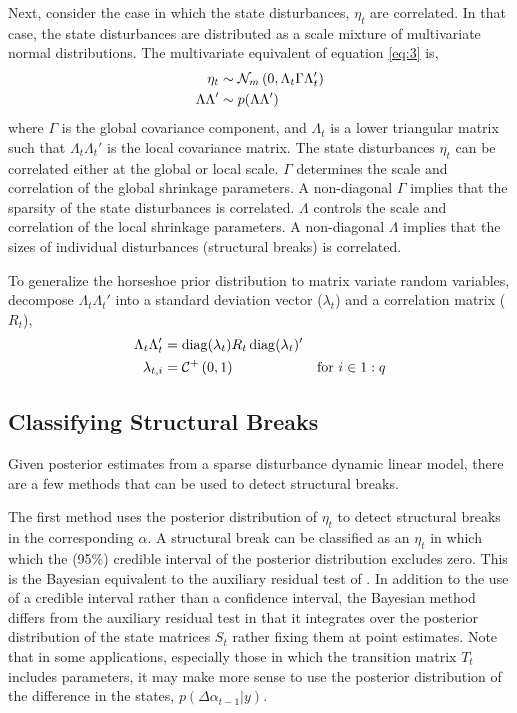 \documentclass{article}
\begin{document}
Next, consider the case in which the state disturbances, $\eta_{t}$ are correlated.
In that case, the state disturbances are distributed as a scale mixture of multivariate normal distributions.
The multivariate equivalent of equation \eqref{eq:3} is,
\begin{equation}
  \begin{aligned}[t]
    \eta_{t} &\sim \dmvnorm{0, \Lambda_{t} \Gamma \Lambda_{t}'}{m} \\
    \Lambda \Lambda' & \sim p(\Lambda \Lambda')
  \end{aligned}
\end{equation}
where $\Gamma$ is the global covariance component, and $\Lambda_{t}$ is a lower triangular matrix such that  $\Lambda_{t} \Lambda_{t}'$ is the local covariance matrix.
The state disturbances $\eta_{t}$ can be correlated either at the global or local scale.
$\Gamma$ determines the scale and correlation of the global shrinkage parameters.
A non-diagonal $\Gamma$ implies that the sparsity of the state disturbances is correlated.
$\Lambda$ controls the scale and correlation of the local shrinkage parameters.
A non-diagonal $\Lambda$ implies that the sizes of individual disturbances (structural breaks) is correlated.

To generalize the horseshoe prior distribution to matrix variate random variables, decompose $\Lambda_{t} \Lambda_{t}'$ into a standard deviation vector ($\lambda_{t}$) and a correlation matrix ($R_{t}$),%
\begin{align}
  \label{eq:16}
  \Lambda_{t} \Lambda_{t}' &= \diag(\lambda_{t}) R_{t} \diag(\lambda_{t})' \\
  \label{eq:17}
  \lambda_{t,i} &= \dhalfcauchy{0, 1} & \text{for $i \in 1:q$}
\end{align}

\subsection{Classifying Structural Breaks}
\label{sec:structural-breaks}

Given posterior estimates from a sparse disturbance dynamic linear model, there are a few methods that can be used to detect structural breaks.

The first method uses the posterior distribution of $\eta_{t}$ to detect structural breaks in the corresponding $\alpha$.
A structural break can be classified as an $\eta_{t}$ in which which the (95\%) credible interval of the posterior distribution excludes zero.
This is the Bayesian equivalent to the auxiliary residual test of \textcites{JongPenzer1998}{DurbinKoopman2001}.%
In addition to the use of a credible interval rather than a confidence interval, the Bayesian method differs from the auxiliary residual test in that it integrates over the posterior distribution of the state matrices $S_{t}$ rather fixing them at point estimates.
Note that in some applications, especially those in which the transition matrix $T_{t}$ includes parameters, it may make more sense to use the posterior distribution of the difference in the states, $p(\Delta \alpha_{t - 1} | y)$.
\end{document}
